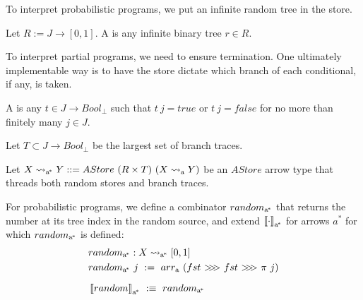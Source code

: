 To interpret probabilistic programs, we put an infinite random tree in the store.

\begin{definition}
Let $R := J \to [0,1]$.
A  is any infinite binary tree $r \in R$.
\end{definition}

To interpret partial programs, we need to ensure termination.
One ultimately implementable way is to have the store dictate which branch of each conditional, if any, is taken.

\begin{definition}
A  is any $t \in J \to Bool_\bot$ such that $t~j = true$ or $t~j = false$ for no more than finitely many $j \in J$.

Let $T \subset J \to Bool_\bot$ be the largest set of branch traces.
\end{definition}

Let $X \rightsquigarrow_\mathrm{a^{\mspace{-2mu}*}} Y ::= AStore~(R \times T)~(X \rightsquigarrow_\mathrm{a} Y)$ be an $AStore$ arrow type that threads both random stores and branch traces.

For probabilistic programs, we define a combinator $random_\mathrm{a^{\mspace{-2mu}*}}$ that returns the number at its tree index in the random source, and extend $\left\llbracket{\cdot}\right\rrbracket_\mathrm{a^{\mspace{-2mu}*}}$ for arrows $a^*$ for which $random_\mathrm{a^{\mspace{-2mu}*}}$ is defined:
\begin{equation}
\begin{aligned}
	&random\genc : X \arrow\genc [0,1] \\
	&random\genc~j \ := \ \arrowarr\gen~(fst~\arrowcomp~fst~\arrowcomp~\pi~j) \\[6pt]
	&\meaningof{random}\genc \ :\equiv \ random\genc
\end{aligned}
\end{equation}


